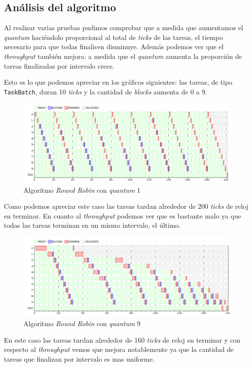 \subsection{Análisis del algoritmo}

Al realizar varias pruebas pudimos comprobar que a medida que aumentamos el \textit{quantum} haciéndolo proporcional al total de \emph{ticks} de las tareas, el tiempo necesario para que todas finalicen disminuye. Además podemos ver que el \emph{throughput} también mejora: a medida que el \emph{quantum} aumenta la proporción de tareas finalizadas por intervalo crece.

Esto es lo que podemos apreciar en los gráficos siguientes: las tareas, de tipo \verb|TaskBatch|, duran 10 \emph{ticks} y la cantidad de \emph{blocks} aumenta de 0 a 9. 

\begin{figure}[H]
\centering
\includegraphics[scale=0.4]{./graficos/out_batch_fijo1.png}
\caption{Algoritmo \emph{Round Robin} con \emph{quantum} 1}
\end{figure}  

Como podemos apreciar este caso las tareas tardan alrededor de 200 \emph{ticks} de reloj en terminar. En cuanto al \emph{throughput} podemos ver que es bastante malo ya que todas las tareas terminan en un mismo intervalo, el último. 
 
\begin{figure}[H]
\centering
\includegraphics[scale=0.4]{./graficos/out_batch_fijo9.png}
\caption{Algoritmo \emph{Round Robin} con \textit{quantum} 9} 
\end{figure}

En este caso las tareas tardan alrededor de 160 \emph{ticks} de reloj en terminar y con respecto al \emph{throughput} vemos que mejora notablemente ya que la cantidad de tareas que finalizan por intervalo es mas uniforme.